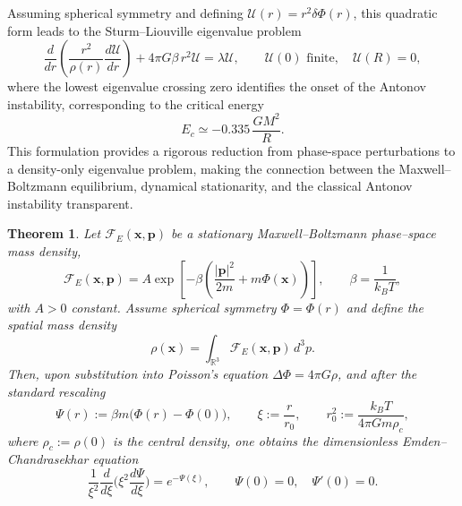\documentclass[12pt,a4paper]{article}
\newtheorem{thm}{Theorem}[section]
\numberwithin{equation}{section}
\begin{document}
Assuming spherical symmetry and defining \(\mathcal{U}(r) = r^2 \delta \Phi(r)\), this quadratic form leads to the Sturm--Liouville eigenvalue problem
\[
\frac{d}{dr} \left( \frac{r^2}{\rho(r)} \frac{d\mathcal{U}}{dr} \right)
+ 4 \pi G \beta \, r^2 \mathcal{U} = \lambda \mathcal{U},
\qquad \mathcal{U}(0) \text{ finite}, \quad \mathcal{U}(R) = 0,
\]
where the lowest eigenvalue crossing zero identifies the onset of the Antonov instability, corresponding to the critical energy
\[
E_c \simeq -0.335 \, \frac{G M^2}{R}.
\]
This formulation provides a rigorous reduction from phase-space perturbations to a density-only eigenvalue problem, making the connection between the Maxwell--Boltzmann equilibrium, dynamical stationarity, and the classical Antonov instability transparent.

\begin{thm}
Let $\mathcal{F}_E(\mathbf{x},\mathbf{p})$ be a stationary Maxwell--Boltzmann phase--space mass density,
\[
\mathcal{F}_E(\mathbf{x},\mathbf{p}) = A \exp\!\left[-\beta\!\left(\frac{|\mathbf{p}|^2}{2m} + m\Phi(\mathbf{x})\right)\right],
\qquad \beta=\frac{1}{k_B T},
\]
with $A>0$ constant.
Assume spherical symmetry $\Phi=\Phi(r)$ and define the spatial mass density
\[
\rho(\mathbf{x}) = \int_{\mathbb{R}^3} \mathcal{F}_E(\mathbf{x},\mathbf{p})\,d^3p.
\]
Then, upon substitution into Poisson's equation $\Delta\Phi = 4\pi G \rho$, and after the standard rescaling
\[
\Psi(r) := \beta m\big(\Phi(r)-\Phi(0)\big), \qquad
\xi := \frac{r}{r_0}, \qquad
r_0^2 := \frac{k_B T}{4\pi G m \rho_c},
\]
where $\rho_c:=\rho(0)$ is the central density, one obtains the dimensionless Emden--Chandrasekhar equation
\[
\boxed{
\frac{1}{\xi^2}\frac{d}{d\xi}\!\Big(\xi^2\frac{d\Psi}{d\xi}\Big) = e^{-\Psi(\xi)},
\qquad \Psi(0)=0,\quad \Psi'(0)=0.
}
\]
\end{thm}
\end{document}
